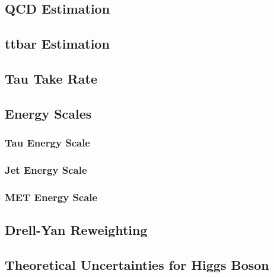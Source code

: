 \subsection{QCD Estimation}
\subsection{ttbar Estimation}
\subsection{Tau Take Rate}
\subsection{Energy Scales}
\subsubsection{Tau Energy Scale}
\subsubsection{Jet Energy Scale}
\subsubsection{MET Energy Scale}
\subsection{Drell-Yan Reweighting}
\subsection{Theoretical Uncertainties for Higgs Boson}



